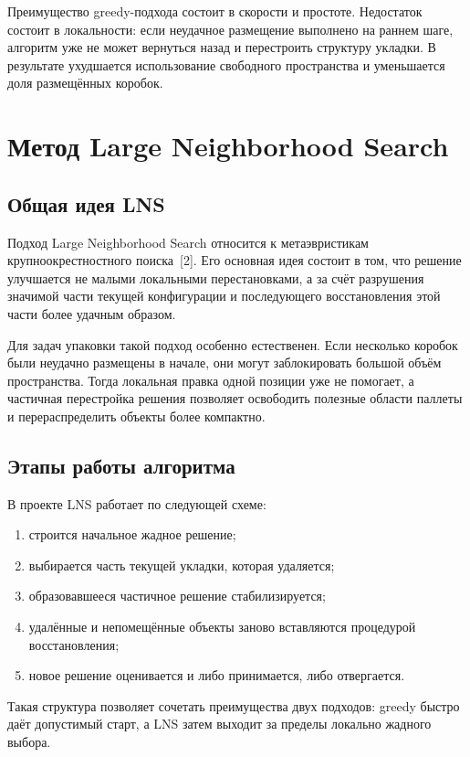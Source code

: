 \documentclass[12pt,a4paper]{article}
\begin{document}
Преимущество greedy-подхода состоит в скорости и простоте. Недостаток состоит в локальности: если неудачное размещение выполнено на раннем шаге, алгоритм уже не может вернуться назад и перестроить структуру укладки. В результате ухудшается использование свободного пространства и уменьшается доля размещённых коробок.

\section{Метод Large Neighborhood Search}

\subsection{Общая идея LNS}

Подход Large Neighborhood Search относится к метаэвристикам крупноокрестностного поиска~[2]. Его основная идея состоит в том, что решение улучшается не малыми локальными перестановками, а за счёт разрушения значимой части текущей конфигурации и последующего восстановления этой части более удачным образом.

Для задач упаковки такой подход особенно естественен. Если несколько коробок были неудачно размещены в начале, они могут заблокировать большой объём пространства. Тогда локальная правка одной позиции уже не помогает, а частичная перестройка решения позволяет освободить полезные области паллеты и перераспределить объекты более компактно.

\subsection{Этапы работы алгоритма}

В проекте LNS работает по следующей схеме:
\begin{enumerate}
  \item строится начальное жадное решение;
  \item выбирается часть текущей укладки, которая удаляется;
  \item образовавшееся частичное решение стабилизируется;
  \item удалённые и непомещённые объекты заново вставляются процедурой восстановления;
  \item новое решение оценивается и либо принимается, либо отвергается.
\end{enumerate}

Такая структура позволяет сочетать преимущества двух подходов: greedy быстро даёт допустимый старт, а LNS затем выходит за пределы локально жадного выбора.
\end{document}
